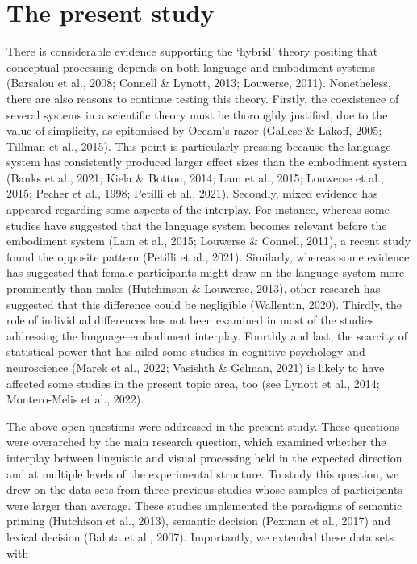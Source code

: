 \documentclass[
  12pt,
  man,floatsintext]{apa7}
\begin{document}
\hypertarget{the-present-study}{%
\section{The present study}\label{the-present-study}}

There is considerable evidence supporting the `hybrid' theory positing that conceptual processing depends on both language and embodiment systems (Barsalou et al., 2008; Connell \& Lynott, 2013; Louwerse, 2011). Nonetheless, there are also reasons to continue testing this theory. Firstly, the coexistence of several systems in a scientific theory must be thoroughly justified, due to the value of simplicity, as epitomised by Occam's razor (Gallese \& Lakoff, 2005; Tillman et al., 2015). This point is particularly pressing because the language system has consistently produced larger effect sizes than the embodiment system (Banks et al., 2021; Kiela \& Bottou, 2014; Lam et al., 2015; Louwerse et al., 2015; Pecher et al., 1998; Petilli et al., 2021). Secondly, mixed evidence has appeared regarding some aspects of the interplay. For instance, whereas some studies have suggested that the language system becomes relevant before the embodiment system (Lam et al., 2015; Louwerse \& Connell, 2011), a recent study found the opposite pattern (Petilli et al., 2021). Similarly, whereas some evidence has suggested that female participants might draw on the language system more prominently than males (Hutchinson \& Louwerse, 2013), other research has suggested that this difference could be negligible (Wallentin, 2020). Thirdly, the role of individual differences has not been examined in most of the studies addressing the language--embodiment interplay. Fourthly and last, the scarcity of statistical power that has ailed some studies in cognitive psychology and neuroscience (Marek et al., 2022; Vasishth \& Gelman, 2021) is likely to have affected some studies in the present topic area, too (see Lynott et al., 2014; Montero-Melis et al., 2022).

The above open questions were addressed in the present study. These questions were overarched by the main research question, which examined whether the interplay between linguistic and visual processing held in the expected direction and at multiple levels of the experimental structure. To study this question, we drew on the data sets from three previous studies whose samples of participants were larger than average. These studies implemented the paradigms of semantic priming (Hutchison et al., 2013), semantic decision (Pexman et al., 2017) and lexical decision (Balota et al., 2007). Importantly, we extended these data sets with
\end{document}
